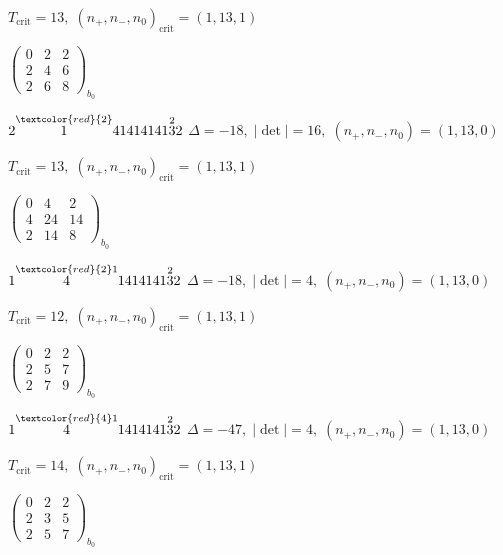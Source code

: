 \documentclass[10pt]{article}
\begin{document}
\hspace{1em}$T_{\text{crit}}=13,\; (n_+,n_-,n_0)_{\text{crit}}=(1,13,1)$

\hspace{2em}$\left(\begin{smallmatrix}0 & 2 & 2 \\ 2 & 4 & 6 \\ 2 & 6 & 8\end{smallmatrix}\right)_{\!b_0}$

\smallskip

$2\overset{\textcolor{red}{2}}{1}41414141\overset{2}{3}2$ \quad $\Delta=-18,\; |\det|=16,\; (n_+,n_-,n_0)=(1,13,0)$

\hspace{1em}$T_{\text{crit}}=13,\; (n_+,n_-,n_0)_{\text{crit}}=(1,13,1)$

\hspace{2em}$\left(\begin{smallmatrix}0 & 4 & 2 \\ 4 & 24 & 14 \\ 2 & 14 & 8\end{smallmatrix}\right)_{\!b_0}$

\smallskip

$1\overset{\textcolor{red}{2}1}{4}1414141\overset{2}{3}2$ \quad $\Delta=-18,\; |\det|=4,\; (n_+,n_-,n_0)=(1,13,0)$

\hspace{1em}$T_{\text{crit}}=12,\; (n_+,n_-,n_0)_{\text{crit}}=(1,13,1)$

\hspace{2em}$\left(\begin{smallmatrix}0 & 2 & 2 \\ 2 & 5 & 7 \\ 2 & 7 & 9\end{smallmatrix}\right)_{\!b_0}$

$1\overset{\textcolor{red}{4}1}{4}1414141\overset{2}{3}2$ \quad $\Delta=-47,\; |\det|=4,\; (n_+,n_-,n_0)=(1,13,0)$

\hspace{1em}$T_{\text{crit}}=14,\; (n_+,n_-,n_0)_{\text{crit}}=(1,13,1)$

\hspace{2em}$\left(\begin{smallmatrix}0 & 2 & 2 \\ 2 & 3 & 5 \\ 2 & 5 & 7\end{smallmatrix}\right)_{\!b_0}$
\end{document}

